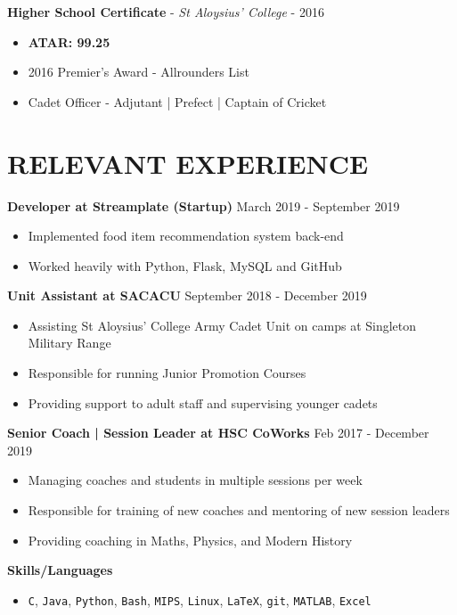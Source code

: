 \documentclass[a4paper,11pt]{article} %
\begin{document}
{{\raggedright
\textbf{Higher School Certificate} - \textit{St Aloysius' College} - 2016\\
}
\begin{itemize}[wide]
	\item \textbf{ATAR: 99.25}
	\item 2016 Premier's Award - Allrounders List
	\item Cadet Officer - Adjutant | Prefect | Captain of Cricket
\end{itemize}

\section{RELEVANT EXPERIENCE}
{\raggedright
	\textbf{Developer at Streamplate (Startup)} \hfill March 2019 - September 2019
\begin{itemize}[wide]
	\item Implemented food item recommendation system back-end
	\item Worked heavily with Python, Flask, MySQL and GitHub
\end{itemize}

\textbf{Unit Assistant at SACACU} \hfill September 2018 - December 2019
\begin{itemize}[wide]
	\item Assisting St Aloysius' College Army Cadet Unit on camps at Singleton Military Range
	\item Responsible for running Junior Promotion Courses
	\item Providing support to adult staff and supervising younger cadets
\end{itemize}

\textbf{Senior Coach | Session Leader at HSC CoWorks} \hfill Feb 2017 - December 2019
\begin{itemize}[wide]
	\item Managing coaches and students in multiple sessions per week
	\item Responsible for training of new coaches and mentoring of new session leaders
	\item Providing coaching in Maths, Physics, and Modern History
\end{itemize}
}

{\raggedright
\textbf{Skills/Languages} \\
\begin{itemize}[wide]
	\item \texttt{C}, \texttt{Java}, \texttt{Python}, \texttt{Bash}, \texttt{MIPS}, \texttt{Linux}, \texttt{LaTeX}, \texttt{git}, \texttt{MATLAB}, \texttt{Excel}
\end{itemize}
}

}
\end{document}

